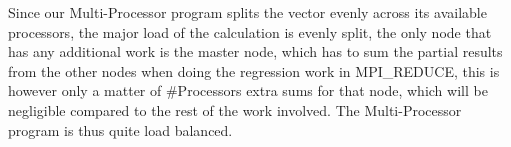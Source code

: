 Since our Multi-Processor program splits the vector evenly across its available processors, the major load of the calculation is evenly split, the only node that has any additional work is the master node, which has to sum the partial results from the other nodes when doing the regression work in MPI\_REDUCE, this is however only a matter of \#Processors extra sums for that node, which will be negligible compared to the rest of the work involved. The Multi-Processor program is thus quite load balanced.
